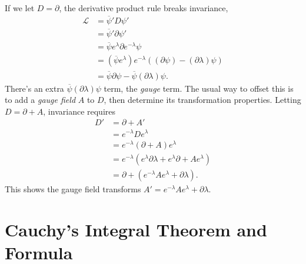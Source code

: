 	If we let $D = \partial$, the derivative product rule breaks invariance,	
	\begin{align*}
	\mathcal{L} &= \overline{\psi}' D \psi' \\
	&= \overline{\psi}' \partial \psi' \\
	&= \overline{\psi}e^{\lambda} \partial e^{-\lambda}\psi \\
	&= \left(\overline{\psi}e^{\lambda}\right) e^{-\lambda}\left(\left(\partial\psi\right) - \left(\partial\lambda\right)\psi\right) \\
	&= \overline{\psi}\partial\psi - \overline{\psi}\left(\partial\lambda\right)\psi.
	\end{align*} 	
	There's an extra $\overline{\psi}\left(\partial\lambda\right)\psi$ term, the \emph{gauge} term. The usual way to offset this is to add a \emph{gauge field} $A$ to $D$, then determine its transformation properties. Letting $D = \partial + A$, invariance requires	
	\begin{align*}
	D' &= \partial + A' \\
	&= e^{-\lambda}De^{\lambda}\\
	&=e^{-\lambda}\left(\partial + A\right)e^{\lambda} \\
	&= e^{-\lambda}\left(e^{\lambda}\partial\lambda + e^{\lambda}\partial + Ae^{\lambda}\right)\\
	&= \partial + \left(e^{-\lambda}Ae^{\lambda}+\partial\lambda\right).
	\end{align*}	
	This shows the gauge field transforms $A' = e^{-\lambda}Ae^{\lambda}+\partial\lambda.$
	
	
	\section{Cauchy's Integral Theorem and Formula}